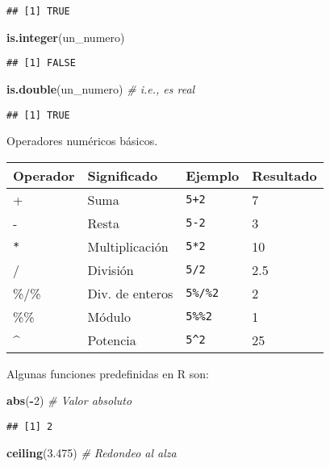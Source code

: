 \documentclass[
]{book}
\newenvironment{Shaded}{\begin{snugshade}}{\end{snugshade}}
\newcommand{\CommentTok}[1]{\textcolor[rgb]{0.56,0.35,0.01}{\textit{#1}}}
\newcommand{\DecValTok}[1]{\textcolor[rgb]{0.00,0.00,0.81}{#1}}
\newcommand{\FloatTok}[1]{\textcolor[rgb]{0.00,0.00,0.81}{#1}}
\newcommand{\KeywordTok}[1]{\textcolor[rgb]{0.13,0.29,0.53}{\textbf{#1}}}
\newcommand{\NormalTok}[1]{#1}
\newcommand{\OperatorTok}[1]{\textcolor[rgb]{0.81,0.36,0.00}{\textbf{#1}}}
\begin{document}
\begin{verbatim}
## [1] TRUE
\end{verbatim}

\begin{Shaded}
\begin{Highlighting}[]
\KeywordTok{is.integer}\NormalTok{(un_numero)}
\end{Highlighting}
\end{Shaded}

\begin{verbatim}
## [1] FALSE
\end{verbatim}

\begin{Shaded}
\begin{Highlighting}[]
\KeywordTok{is.double}\NormalTok{(un_numero) }\CommentTok{# i.e., es real}
\end{Highlighting}
\end{Shaded}

\begin{verbatim}
## [1] TRUE
\end{verbatim}

Operadores numéricos básicos.

\begin{longtable}[]{@{}llll@{}}
\toprule
Operador & Significado & Ejemplo & Resultado\tabularnewline
\midrule
\endhead
+ & Suma & \texttt{5+2} & 7\tabularnewline
- & Resta & \texttt{5-2} & 3\tabularnewline
\texttt{*} & Multiplicación & \texttt{5*2} & 10\tabularnewline
/ & División & \texttt{5/2} & 2.5\tabularnewline
\%/\% & Div. de enteros & \texttt{5\%/\%2} & 2\tabularnewline
\%\% & Módulo & \texttt{5\%\%2} & 1\tabularnewline
\^{} & Potencia & \texttt{5\^{}2} & 25\tabularnewline
\bottomrule
\end{longtable}

Algunas funciones predefinidas en R son:

\begin{Shaded}
\begin{Highlighting}[]
\KeywordTok{abs}\NormalTok{(}\OperatorTok{-}\DecValTok{2}\NormalTok{) }\CommentTok{# Valor absoluto}
\end{Highlighting}
\end{Shaded}

\begin{verbatim}
## [1] 2
\end{verbatim}

\begin{Shaded}
\begin{Highlighting}[]
\KeywordTok{ceiling}\NormalTok{(}\FloatTok{3.475}\NormalTok{) }\CommentTok{# Redondeo al alza}
\end{Highlighting}
\end{Shaded}
\end{document}
